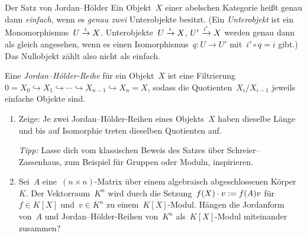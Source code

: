 \documentclass{uebblatt}
\begin{document}
\begin{aufgabe}{Der Satz von Jordan--Hölder}
Ein Objekt~$X$ einer abelschen Kategorie heißt genau dann \emph{einfach}, wenn
es \emph{genau zwei} Unterobjekte besitzt. (Ein \emph{Unterobjekt} ist ein
Monomorphismus~$U \xrightarrow{i} X$. Unterobjekte~$U \xrightarrow{i} X$, $U' \xrightarrow{i'} X$
werden genau dann als gleich angesehen, wenn es einen Isomorphismus~$q : U \to
U'$ mit~$i' \circ q = i$ gibt.) Das Nullobjekt zählt also nicht als einfach.

Eine \emph{Jordan--Hölder-Reihe} für ein Objekt~$X$ ist eine Filtrierung
$0 = X_0 \hookrightarrow X_1 \hookrightarrow \cdots \hookrightarrow X_{n-1}
\hookrightarrow X_n = X$, sodass die Quotienten~$X_i/X_{i-1}$ jeweils einfache
Objekte sind.
\begin{enumerate}
\item Zeige: Je zwei Jordan--Hölder-Reihen eines Objekts~$X$ haben dieselbe
Länge und bis auf Isomorphie treten dieselben Quotienten auf.

\emph{Tipp:} Lasse dich vom klassischen Beweis des Satzes über
Schreier--Zassenhaus, zum Beispiel für Gruppen oder Moduln, inspirieren.
\item Sei~$A$ eine~$(n \times n)$-Matrix über einem algebraisch abgeschlossenen
Körper~$K$. Der Vektorraum~$K^n$ wird durch die Setzung~$f(X) \cdot v \vcentcolon= f(A)v$
für~$f \in K[X]$ und~$v \in K^n$ zu einem~$K[X]$-Modul. Hängen die
Jordanform von~$A$ und Jordan--Hölder-Reihen von~$K^n$ als~$K[X]$-Modul
miteinander zusammen?
\end{enumerate}
\end{aufgabe}
\end{document}
